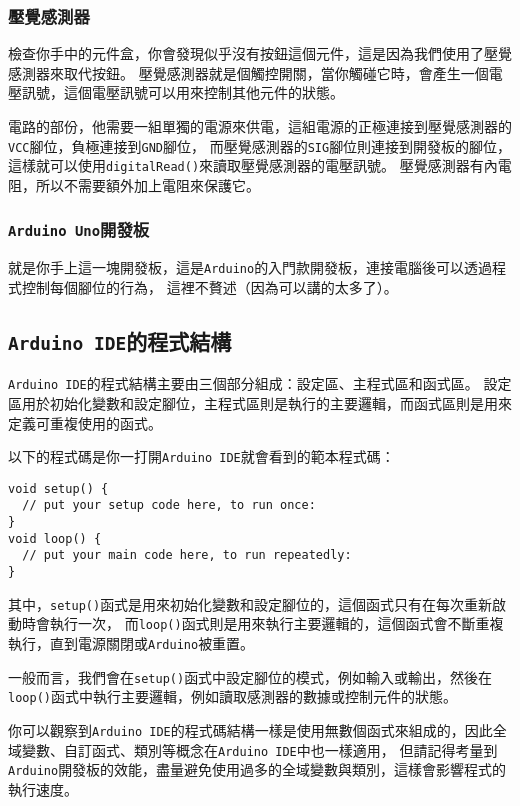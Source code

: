 \documentclass[12pt,a4paper]{article}
\begin{document}
\subsubsection{壓覺感測器}

檢查你手中的元件盒，你會發現似乎沒有按鈕這個元件，這是因為我們使用了壓覺感測器來取代按鈕。
壓覺感測器就是個觸控開關，當你觸碰它時，會產生一個電壓訊號，這個電壓訊號可以用來控制其他元件的狀態。

電路的部份，他需要一組單獨的電源來供電，這組電源的正極連接到壓覺感測器的\texttt{VCC}腳位，負極連接到\texttt{GND}腳位，
而壓覺感測器的\texttt{SIG}腳位則連接到開發板的腳位，
這樣就可以使用\texttt{digitalRead()}來讀取壓覺感測器的電壓訊號。
壓覺感測器有內電阻，所以不需要額外加上電阻來保護它。

\subsubsection{\texttt{Arduino Uno}開發板}
就是你手上這一塊開發板，這是\texttt{Arduino}的入門款開發板，連接電腦後可以透過程式控制每個腳位的行為，
這裡不贅述（因為可以講的太多了）。



\subsection{\texttt{Arduino IDE}的程式結構}
\texttt{Arduino IDE}的程式結構主要由三個部分組成：設定區、主程式區和函式區。
設定區用於初始化變數和設定腳位，主程式區則是執行的主要邏輯，而函式區則是用來定義可重複使用的函式。

以下的程式碼是你一打開\texttt{Arduino IDE}就會看到的範本程式碼：
\begin{lstlisting}
void setup() {
  // put your setup code here, to run once:
}
void loop() {
  // put your main code here, to run repeatedly:
}
\end{lstlisting}

其中，\texttt{setup()}函式是用來初始化變數和設定腳位的，這個函式只有在每次重新啟動時會執行一次，
而\texttt{loop()}函式則是用來執行主要邏輯的，這個函式會不斷重複執行，直到電源關閉或\texttt{Arduino}被重置。

一般而言，我們會在\texttt{setup()}函式中設定腳位的模式，例如輸入或輸出，然後在\texttt{loop()}函式中執行主要邏輯，例如讀取感測器的數據或控制元件的狀態。

你可以觀察到\texttt{Arduino IDE}的程式碼結構一樣是使用無數個函式來組成的，因此全域變數、自訂函式、類別等概念在\texttt{Arduino IDE}中也一樣適用，
但請記得考量到\texttt{Arduino}開發板的效能，盡量避免使用過多的全域變數與類別，這樣會影響程式的執行速度。
\end{document}

